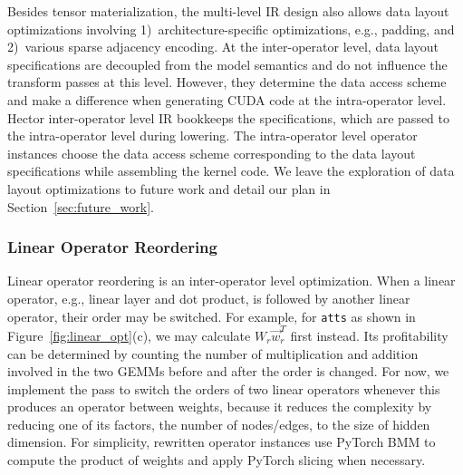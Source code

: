 Besides tensor materialization, the multi-level IR design also allows data layout optimizations involving 1)~architecture-specific optimizations, e.g., padding, and 2)~various sparse adjacency encoding.
At the inter-operator level, data layout specifications are decoupled from the model semantics and do not influence the transform passes at this level. 
However, they determine the data access scheme and make a difference when generating CUDA code at the intra-operator level.
Hector inter-operator level IR bookkeeps the specifications, which are passed to the intra-operator level during lowering. 
The intra-operator level operator instances choose the data access scheme corresponding to the data layout specifications while assembling the kernel code.
We leave the exploration of data layout optimizations to future work and detail our plan in Section~\ref{sec:future_work}. 




\subsubsection{Linear Operator Reordering}
\label{sec:inter_op_opt}
Linear operator reordering is an inter-operator level optimization. When a linear operator, e.g., linear layer and dot product, is followed by another linear operator, their order may be switched. 
For example, for \texttt{atts} as shown in Figure~\ref{fig:linear_opt}(c), we may calculate $W_r\vec{w}_{r}^T$ first instead. Its profitability can be determined by counting the number of multiplication and addition involved in the two GEMMs before and after the order is changed. For now, we implement the pass to switch the orders of two linear operators whenever this produces an operator between weights, because it reduces the complexity by reducing one of its factors, the number of nodes/edges, to the size of hidden dimension. For simplicity, rewritten operator instances use PyTorch BMM to compute the product of weights and apply PyTorch slicing when necessary.



